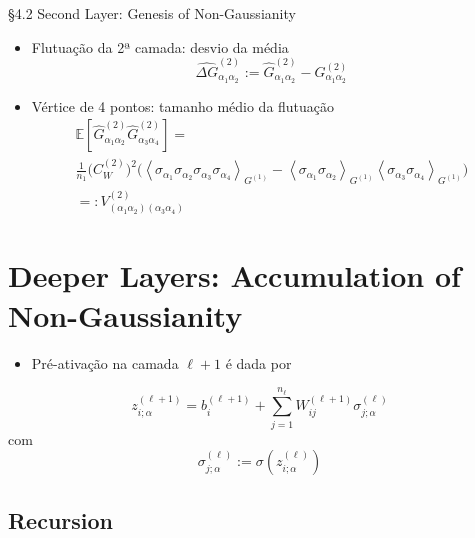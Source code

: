 \documentclass{beamer}
\newcommand{\EE}{\mathbb{E}}
\def\mi#1{{\alpha_{#1}}}
\def\eell{{(\ell)}}
\def\eellum{{(\ell+1)}}
\def\Gchapp#1{\widehat{G}^{(#1)}}
\newcommand{\Gchapeu}[3]{{\Gchapp{#1}_{\mi{#2}\mi{#3}}}}
\newcommand{\Gnormal}[3]{{G^{(#1)}_{\mi{#2}\mi{#3}}}}
\newcommand{\Gflutu}[3]{{\widehat{\Delta G}^{(#1)}_{\mi{#2}\mi{#3}}}}
\newcommand{\Vertice}[5]{V^{(#1)}_{(\mi#2\mi#3)(\mi#4\mi#5)}}
\newcommand{\Expectation}[2]{\left\langle #1 \right\rangle_{#2}}
\begin{document}
\begin{frame}{\S 4.2 Second Layer: Genesis of Non-Gaussianity}
\begin{itemize}
	\item Flutuação da 2ª camada: desvio da média
	\begin{equation*}\tag{4.38}
		\Gflutu212 := \Gchapeu212 - \Gnormal212
	\end{equation*}
	\item Vértice de 4 pontos: tamanho médio da flutuação
	\begin{multline*}
		\EE\left[\Gchapeu212\Gchapeu234\right]  = \\ \frac{1}{n_1}\big(C_W^{(2)}\big)^2\big(  \Expectation{\sigma_\mi1\sigma_\mi2\sigma_\mi3\sigma_\mi4}{G^{(1)}} -  \Expectation{\sigma_\mi1\sigma_\mi2 }{G^{(1)}}  \Expectation{\sigma_\mi3\sigma_\mi4}{G^{(1)}}\big) \\
		=: \Vertice21234 \tag{4.40}
	\end{multline*}
\end{itemize}
\end{frame}


\section{Deeper Layers: Accumulation of Non-Gaussianity}

\begin{frame}
\tableofcontents[currentsection]
\end{frame}

\begin{frame}
	\begin{itemize}
		\item Pré-ativação na camada $\ell+1$ é dada por
	\end{itemize}
	\begin{equation*}
		z_{i;\alpha}^\eellum = b_i^\eellum + \sum_{j=1}^{n_\ell} W_{ij}^\eellum\sigma_{j;\alpha}^\eell
	\end{equation*}
	com 
	$$\sigma_{j;\alpha}^\eell := \sigma\left(z_{i;\alpha}^\eell\right)$$
\end{frame}

\subsection{Recursion}
\end{document}
